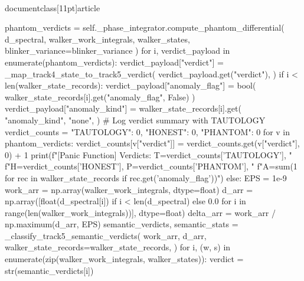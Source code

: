 \\documentclass[11pt]{article}
\begin{document}
\begin{CodeBlock}
                        phantom_verdicts = self._phase_integrator.compute_phantom_differential(
                            d_spectral, walker_work_integrals, walker_states,
                            blinker_variance=blinker_variance
                        )
                        for i, verdict_payload in enumerate(phantom_verdicts):
                            verdict_payload["verdict"] = _map_track4_state_to_track5_verdict(
                                verdict_payload.get("verdict"),
                            )
                            if i < len(walker_state_records):
                                verdict_payload["anomaly_flag"] = bool(
                                    walker_state_records[i].get("anomaly_flag", False)
                                )
                                verdict_payload["anomaly_kind"] = walker_state_records[i].get(
                                    "anomaly_kind",
                                    "none",
                                )
                        # Log verdict summary with TAUTOLOGY
                        verdict_counts = {"TAUTOLOGY": 0, "HONEST": 0, "PHANTOM": 0}
                        for v in phantom_verdicts:
                            verdict_counts[v["verdict"]] = verdict_counts.get(v["verdict"], 0) + 1
                        print(f"[Panic Function] Verdicts: T={verdict_counts['TAUTOLOGY']}, "
                              f"H={verdict_counts['HONEST']}, P={verdict_counts['PHANTOM']}, "
                              f"A={sum(1 for rec in walker_state_records if rec.get('anomaly_flag'))}")
                    else:
                        EPS = 1e-9
                        work_arr = np.array(walker_work_integrals, dtype=float)
                        d_arr = np.array([float(d_spectral[i]) if i < len(d_spectral) else 0.0
                                          for i in range(len(walker_work_integrals))], dtype=float)
                        delta_arr = work_arr / np.maximum(d_arr, EPS)
                        semantic_verdicts, semantic_stats = _classify_track5_semantic_verdicts(
                            work_arr,
                            d_arr,
                            walker_state_records=walker_state_records,
                        )
                        for i, (w, s) in enumerate(zip(walker_work_integrals, walker_states)):
                            verdict = str(semantic_verdicts[i])


\end{CodeBlock}
\end{document}
